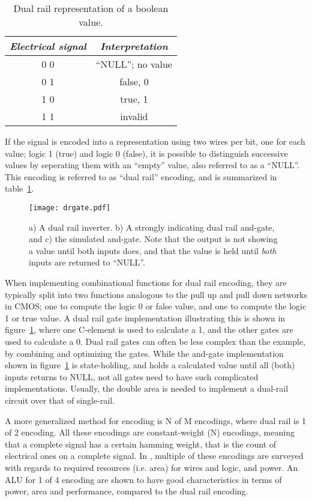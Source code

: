 \begin{table}
  \centering
  \begin{tabular}{|c|c|}
    \hline
    \emph{Electrical signal} & \emph{Interpretation} \\
    \hline
    0 0 & ``NULL''; no value \\
    0 1 & false, 0 \\
    1 0 & true, 1 \\
    1 1 & invalid \\
    \hline
  \end{tabular}
  \label{tab:dr}
  \caption{Dual rail representation of a boolean value.}
\end{table}

If the signal is encoded into a representation using two wires per
bit, one for each value; logic 1 (true) and logic 0 (false), it is
possible to distinguish successive values by seperating them with an
``empty'' value, also referred to as a ``NULL''. This encoding is
referred to as ``dual rail'' encoding, and is summarized in
table~\ref{tab:dr}.

\begin{figure}[htbp]
  \centering
  \texttt{[image: drgate.pdf]}
  \caption{a) A dual rail inverter. b) A strongly indicating dual rail
    and-gate, and c) the simulated and-gate. Note that the output is
    not showing a value until both inputs does, and that the value is
    held until \emph{both} inputs are returned to ``NULL''.}
  \label{fig:drgate}
\end{figure}

When implementing combinational functions for dual rail encoding, they
are typically split into two functions analogous to the pull up and
pull down networks in CMOS; one to compute the logic 0 or false value,
and one to compute the logic 1 or true value. A dual rail gate
implementation illustrating this is shown in figure~\ref{fig:drgate},
where one C-element is used to calculate a 1, and the other gates are
used to calculate a 0. Dual rail gates can often be less complex than
the example, by combining and optimizing the gates. While the and-gate
implementation shown in figure~\ref{fig:drgate} is state-holding, and
holds a calculated value until all (both) inputs returns to NULL, not
all gates need to have such complicated implementations. Usually, the
double area is needed to implement a dual-rail circuit over that of
single-rail.

A more generalized method for encoding is N of M encodings, where dual
rail is 1 of 2 encoding. All these encodings are constant-weight (N)
encodings, meaning that a complete signal has a certain hamming
weight, that is the count of electrical ones on a complete signal. In
\cite[chapter 9]{nullconv}, multiple of these encodings are surveyed
with regards to required resources (i.e. area) for wires and logic,
and power. An ALU for 1 of 4 encoding are shown to have good
characteristics in terms of power, area and performance, compared to
the dual rail encoding.

